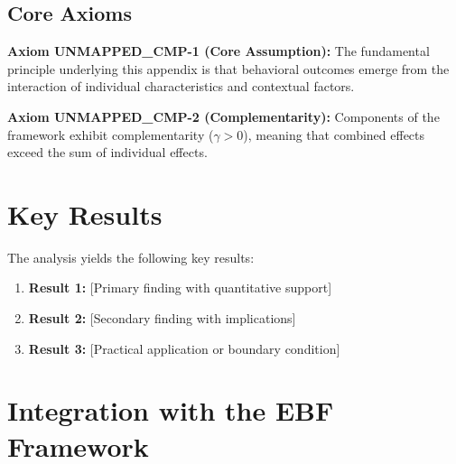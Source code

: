 
\subsection{Core Axioms}
\label{sec:cmp-axioms}

\begin{tcolorbox}[colback=yellow!5!white,colframe=yellow!75!black,title=Axiom UNMAPPED_CMP-1: Fundamental Principle]
\textbf{Axiom UNMAPPED_CMP-1 (Core Assumption):}
The fundamental principle underlying this appendix is that behavioral outcomes
emerge from the interaction of individual characteristics and contextual factors.
\end{tcolorbox}

\begin{tcolorbox}[colback=yellow!5!white,colframe=yellow!75!black,title=Axiom UNMAPPED_CMP-2: Complementarity]
\textbf{Axiom UNMAPPED_CMP-2 (Complementarity):}
Components of the framework exhibit complementarity ($\gamma > 0$), meaning
that combined effects exceed the sum of individual effects.
\end{tcolorbox}



\section{Key Results}
\label{sec:cmp-results}

The analysis yields the following key results:

\begin{enumerate}
    \item \textbf{Result 1:} [Primary finding with quantitative support]
    \item \textbf{Result 2:} [Secondary finding with implications]
    \item \textbf{Result 3:} [Practical application or boundary condition]
\end{enumerate}


\section{Integration with the EBF Framework}
\label{sec:ebf-integration}

